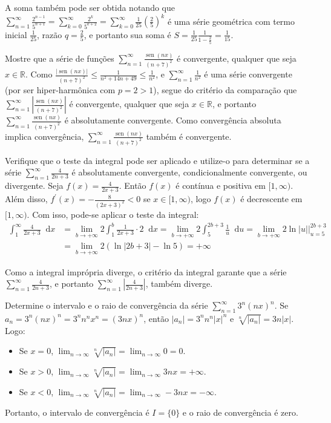 \documentclass[12pt,a4paper]{article}
\newcommand*\diff{\mathop{}\!\mathrm{d}}
\newcommand*\sen{\operatorname{sen}}
\newcommand*\R{\mathbb{R}}
\begin{document}
\begin{ExerciseList}
A soma também pode ser obtida notando que $\sum_{n = 1}^{\infty} \frac{2^{n-1}}{5^{n + 1}} = \sum_{k = 0}^{\infty} \frac{2^k}{5^{k + 2}} = \sum_{k = 0}^{\infty} \frac{1}{25}\left(\frac{2}{5}\right)^k$ é uma série geométrica com termo inicial $\frac{1}{25}$, razão $q = \frac{2}{5}$, e portanto sua soma é $S = \frac{1}{25} \frac{1}{1-\frac{2}{5}} = \frac{1}{15}$.

\Exercise[title={2,0}] Mostre que a série de funções $\displaystyle\sum_{n=1}^\infty \frac{\sen(n x)}{(n+7)^2}$ é convergente, qualquer que seja $x \in \R$.
\Answer Como $\frac{|\sen(n x)|}{(n+7)^2} \leq \frac{1}{n^2+14n+49}\leq \frac{1}{n^2}$, e $\sum_{n=1}^\infty \frac{1}{n^2}$ é uma série convergente (por ser hiper-harmônica com $p=2>1$), segue do critério da comparação que $\displaystyle\sum_{n=1}^\infty \left|\frac{\sen(n x)}{(n+7)^2}\right|$ é convergente, qualquer que seja $x \in \R$, e portanto $\displaystyle\sum_{n=1}^\infty \frac{\sen(n x)}{(n+7)^2}$ é absolutamente convergente. Como convergência absoluta implica convergência, $\displaystyle\sum_{n=1}^\infty \frac{\sen(n x)}{(n+7)^2}$ também é convergente.


\Exercise[title={2,0}] \color{black} Verifique que o teste da integral pode ser aplicado e utilize-o para determinar se a série  $\displaystyle\sum_{n=1}^\infty \frac{4}{2n+3}$ é absolutamente convergente, condicionalmente convergente, ou divergente.
\Answer Seja $f(x) = \frac{4}{2x + 3}$. Então \(f(x)\) é contínua e positiva em \([1, \infty)\). Além disso, \(f^\prime(x) = -\frac{8}{(2x + 3)^2} < 0\) se \(x \in [1, \infty)\), logo \(f(x)\) é decrescente em \([1, \infty)\). Com isso, pode-se aplicar o teste da integral:
\begin{align*}
    \int_1^\infty \frac{4}{2x+3} \diff{x}
    & = \lim_{b \to +\infty} 2\int_1^b \frac{1}{2x+3} \cdot 2 \diff{x}
      = \lim_{b \to +\infty} 2 \int_5^{2b + 3} \frac{1}{u} \diff{u}
      = \lim_{b \to +\infty} 2 \ln|u|\bigg|_{u=5}^{2b+3} \\
    & = \lim_{b \to +\infty} 2 (\ln|2b+3| - \ln 5) = +\infty
\end{align*}

Como a integral imprópria diverge, o critério da integral garante que a série $\displaystyle\sum_{n=1}^\infty \frac{4}{2n+3}$, e portanto $\displaystyle\sum_{n=1}^\infty \left| \frac{4}{2n+3}\right|$, também diverge.


\Exercise[title={2,0}] Determine o intervalo e o raio de convergência da série $\displaystyle\sum_{n=1}^\infty 3^n(nx)^n$.
\Answer Se $a_n = 3^n(nx)^n = 3^nn^nx^n = (3nx)^n$, então $|a_n| = 3^nn^n|x|^n$ e $\sqrt[n]{|a_n|} = 3n|x|$. Logo:
\begin{itemize}
    \item Se $x=0$, $\displaystyle \lim_{n \to \infty} \sqrt[n]{|a_n|} = \lim_{n\to \infty} 0 = 0$.
    \item Se $x>0$, $\displaystyle \lim_{n \to \infty} \sqrt[n]{|a_n|} = \lim_{n\to \infty} 3nx = +\infty$.
    \item Se $x<0$, $\displaystyle \lim_{n \to \infty} \sqrt[n]{|a_n|} = \lim_{n\to \infty} -3nx = -\infty$.
\end{itemize}
Portanto, o intervalo de convergência é $I = \{0\}$ e o raio de convergência é zero.


\end{ExerciseList}
\end{document}

